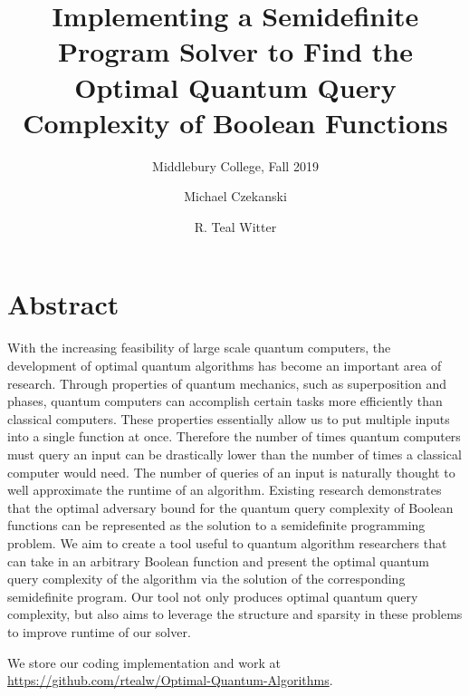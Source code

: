 \documentclass[acmtog]{acmart}
\begin{document}
\title{Implementing a Semidefinite Program Solver to 
Find the Optimal Quantum Query Complexity
of Boolean Functions}

\subtitle{Middlebury College, Fall 2019}

\author{Michael Czekanski}

\author{R. Teal Witter}

\maketitle

\graphicspath{{./../figures/}}
\section*{Abstract}

With the increasing feasibility of large scale quantum computers, the
development of optimal quantum algorithms has become
an important area of research.
Through properties of quantum mechanics, such as
superposition and phases, quantum computers can
accomplish certain tasks more efficiently than
classical computers. These properties essentially
allow us to put multiple inputs into a single function
at once. Therefore the number of times quantum
computers must query an input can be drastically
lower than the number of times a classical computer
would need. The number of queries of an input is
naturally thought to well approximate the runtime of
an algorithm. Existing research demonstrates that the
optimal adversary bound for the quantum query
complexity of Boolean functions can be represented as
the solution to a semidefinite programming problem.
We aim to create a tool useful to quantum algorithm
researchers that can take in an arbitrary Boolean
function and present the optimal quantum query
complexity of the algorithm via the solution of the
corresponding semidefinite program. Our tool not only produces optimal quantum query complexity, but also aims to leverage the structure and sparsity in these problems to improve runtime of our solver.


We store our coding implementation and work at
\url{https://github.com/rtealw/Optimal-Quantum-Algorithms}.










\end{document}
